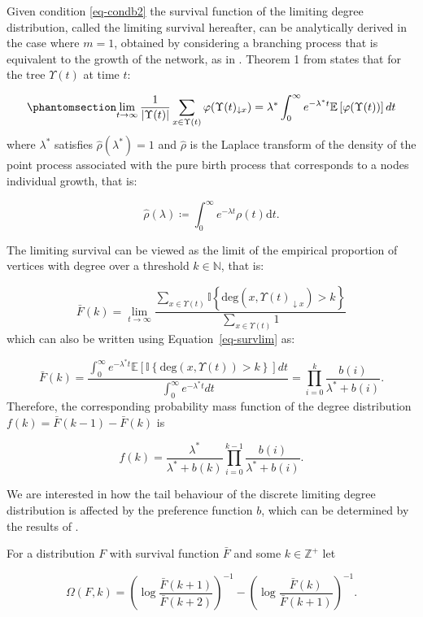 \documentclass[
  sn-basic,
]{sn-jnl}
\theoremstyle{plain}
\theoremstyle{plain}
\theoremstyle{remark}
\begin{document}
Given condition \ref{eq-condb2} the survival function of the limiting
degree distribution, called the limiting survival hereafter, can be
analytically derived in the case where \(m=1\), obtained by considering
a branching process that is equivalent to the growth of the network, as
in \citet{rudas07}. Theorem 1 from \citet{rudas07} states that for the
tree \(\Upsilon(t)\) at time \(t\):

\begin{equation}\phantomsection\label{eq-survlim}{
\lim_{t\rightarrow\infty}\frac{1}{|\Upsilon(t)|}\sum_{x\in\Upsilon(t)}\varphi(\Upsilon(t)_{\downarrow x}) = \lambda^* \int_0^\infty e^{-\lambda^* t}\mathbb E\left[\varphi(\Upsilon(t))\right]dt
}\end{equation} where \(\lambda^*\) satisfies \(\hat\rho(\lambda^*)=1\)
and \(\hat\rho\) is the Laplace transform of the density of the point
process associated with the pure birth process that corresponds to a
nodes individual growth, that is:

\[
\hat\rho(\lambda) \coloneq \int_0^\infty e^{-\lambda t}\rho(t)\mathrm{d}t.
\]

The limiting survival can be viewed as the limit of the empirical
proportion of vertices with degree over a threshold \(k\in\mathbb N\),
that is:

\[
\bar F(k) = \lim_{t\rightarrow\infty}\frac{\sum_{x\in\Upsilon(t)}\mathbb I\left\{\text{deg}(x,\Upsilon(t)_{\downarrow x})>k\right\}}{\sum_{x\in\Upsilon(t)} 1}
\] which can also be written using Equation~\ref{eq-survlim} as:

\[
\bar F(k) = \frac{\int_0^\infty e^{-\lambda^* t}\mathbb E\left[\mathbb I\left\{\text{deg}(x,\Upsilon(t))>k\right\}\right]dt}{\int_0^\infty e^{-\lambda^* t}dt} = \prod_{i=0}^k\frac{b(i)}{\lambda^* + b(i)}.
\] Therefore, the corresponding probability mass function of the degree
distribution \(f(k) = \bar F(k-1) - \bar F(k)\) is

\[
f(k) = \frac{\lambda^*}{\lambda^* + b(k)}\prod_{i=0}^{k-1}\frac{b(i)}{\lambda^*+b(i)}.
\]

We are interested in how the tail behaviour of the discrete limiting
degree distribution is affected by the preference function \(b\), which
can be determined by the results of \citet{shimura12}.

For a distribution \(F\) with survival function \(\bar F\) and some
\(k\in\mathbb Z^+\) let

\[
\Omega(F,k) = \left(\log\displaystyle\frac{\bar F (k+1)}{\bar F (k+2)}\right)^{-1} - \left(\log\displaystyle\frac{\bar F (k)}{\bar F (k+1)}\right)^{-1}.
\]
\end{document}
